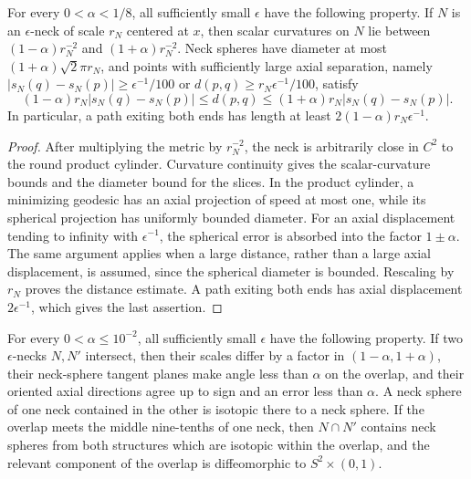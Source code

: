 \begin{lemma}
\label{lem:epsilon-neck-metric-control}
\notready
For every $0<\alpha<1/8$, all sufficiently small $\epsilon$ have the
following property.  If $N$ is an $\epsilon$-neck of scale $r_N$ centered
at $x$, then scalar curvatures on $N$ lie between
$(1-\alpha)r_N^{-2}$ and $(1+\alpha)r_N^{-2}$.  Neck spheres have
diameter at most $(1+\alpha)\sqrt2\pi r_N$, and points with sufficiently
large axial separation, namely
$|s_N(q)-s_N(p)|\ge\epsilon^{-1}/100$ or
$d(p,q)\ge r_N\epsilon^{-1}/100$, satisfy
\[
 (1-\alpha)r_N|s_N(q)-s_N(p)|
 \le d(p,q)
 \le(1+\alpha)r_N|s_N(q)-s_N(p)|.
\]
In particular, a path exiting both ends has length at least
$2(1-\alpha)r_N\epsilon^{-1}$.
\end{lemma}

\begin{proof}
After multiplying the metric by $r_N^{-2}$, the neck is arbitrarily close
in $C^2$ to the round product cylinder.  Curvature continuity gives the
scalar-curvature bounds and the diameter bound for the slices.  In the
product cylinder, a minimizing geodesic has an axial projection of speed at
most one, while its spherical projection has uniformly bounded diameter.
For an axial displacement tending to infinity with $\epsilon^{-1}$, the
spherical error is absorbed into the factor $1\pm\alpha$.  The same
argument applies when a large distance, rather than a large axial
displacement, is assumed, since the spherical diameter is bounded.
Rescaling by $r_N$ proves the distance estimate.  A path exiting both ends
has axial displacement $2\epsilon^{-1}$, which gives the last assertion.
\end{proof}

\begin{proposition}
\label{prop:overlapping-epsilon-necks}
\notready
For every $0<\alpha\le10^{-2}$, all sufficiently small $\epsilon$ have
the following property.  If two $\epsilon$-necks $N,N'$ intersect, then
their scales differ by a factor in $(1-\alpha,1+\alpha)$, their neck-sphere
tangent planes make angle less than $\alpha$ on the overlap, and their
oriented axial directions agree up to sign and an error less than
$\alpha$.  A neck sphere of one neck contained in the other is isotopic
there to a neck sphere.  If the overlap meets the middle nine-tenths of one
neck, then $N\cap N'$ contains neck spheres from both structures which are
isotopic within the overlap, and the relevant component of the overlap is
diffeomorphic to $S^2\times(0,1)$.
\end{proposition}

